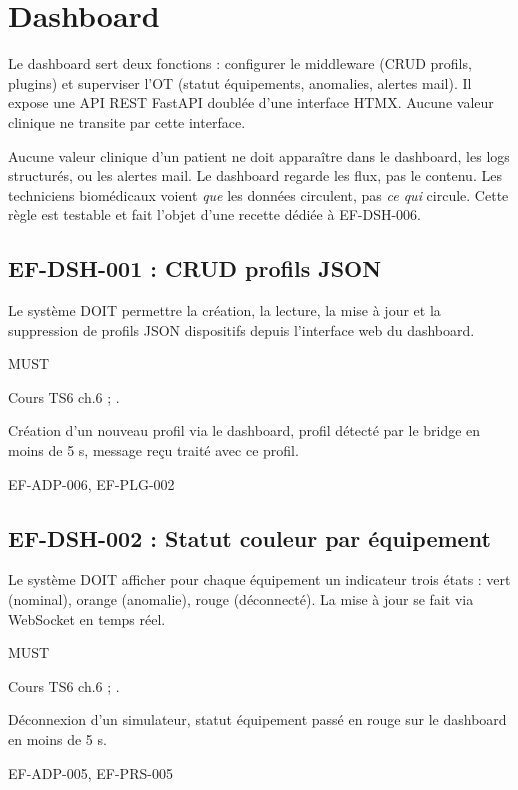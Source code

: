\section{Dashboard}
\label{sec:ef-dashboard}

Le dashboard sert deux fonctions : configurer le middleware (CRUD profils, plugins) et superviser l'OT (statut équipements, anomalies, alertes mail). Il expose une API REST FastAPI doublée d'une interface HTMX. Aucune valeur clinique ne transite par cette interface.

\begin{bridgewarn}
Aucune valeur clinique d'un patient ne doit apparaître dans le dashboard, les logs structurés, ou les alertes mail. Le dashboard regarde les flux, pas le contenu. Les techniciens biomédicaux voient \emph{que} les données circulent, pas \emph{ce qui} circule. Cette règle est testable et fait l'objet d'une recette dédiée à EF-DSH-006.
\end{bridgewarn}

\subsection*{EF-DSH-001 : CRUD profils JSON}
\begin{description}[leftmargin=2.5cm, style=nextline]
  \item[Énoncé] Le système DOIT permettre la création, la lecture, la mise à jour et la suppression de profils JSON dispositifs depuis l'interface web du dashboard.
  \item[Priorité] MUST
  \item[Source] Cours TS6 ch.6 ; \cite{ihe_pcd_tf}.
  \item[Recette] Création d'un nouveau profil via le dashboard, profil détecté par le bridge en moins de 5 s, message reçu traité avec ce profil.
  \item[Lié à] EF-ADP-006, EF-PLG-002
\end{description}

\subsection*{EF-DSH-002 : Statut couleur par équipement}
\begin{description}[leftmargin=2.5cm, style=nextline]
  \item[Énoncé] Le système DOIT afficher pour chaque équipement un indicateur trois états : vert (nominal), orange (anomalie), rouge (déconnecté). La mise à jour se fait via WebSocket en temps réel.
  \item[Priorité] MUST
  \item[Source] Cours TS6 ch.6 ; \cite{ihe_pcd_tf}.
  \item[Recette] Déconnexion d'un simulateur, statut équipement passé en rouge sur le dashboard en moins de 5 s.
  \item[Lié à] EF-ADP-005, EF-PRS-005
\end{description}

